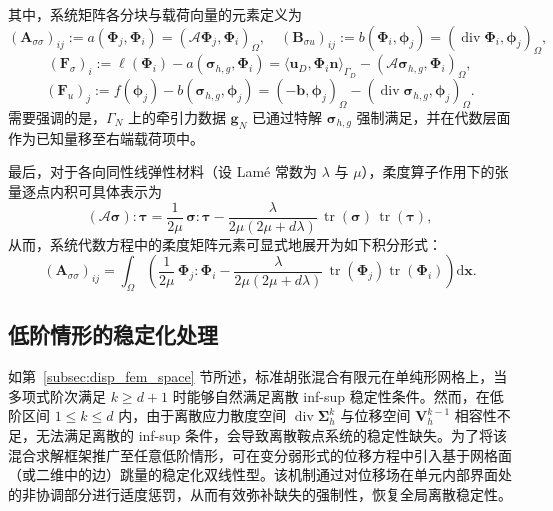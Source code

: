 其中，系统矩阵各分块与载荷向量的元素定义为
\[
(\boldsymbol{A}_{\sigma\sigma})_{ij}:=a(\boldsymbol{\Phi}_j,\boldsymbol{\Phi}_i)=(\mathcal{A}\boldsymbol{\Phi}_j,\boldsymbol{\Phi}_i)_\Omega,\quad
(\boldsymbol{B}_{\sigma u})_{ij}:=b(\boldsymbol{\Phi}_i,\boldsymbol{\phi}_j)=(\operatorname{div}\boldsymbol{\Phi}_i,\boldsymbol{\phi}_j)_\Omega,
\]
\[
(\boldsymbol{F}_{\sigma})_{i}:=\ell(\boldsymbol{\Phi}_i) - a(\boldsymbol{\sigma}_{h,g}, \boldsymbol{\Phi}_i) = \langle \boldsymbol{u}_D,\boldsymbol{\Phi}_i\boldsymbol{n}\rangle_{\Gamma_D} - (\mathcal{A}\boldsymbol{\sigma}_{h,g}, \boldsymbol{\Phi}_i)_\Omega,
\]
\[
(\boldsymbol{F}_{u})_{j}:=f(\boldsymbol{\phi}_j) - b(\boldsymbol{\sigma}_{h,g}, \boldsymbol{\phi}_j) =(-\boldsymbol{b},\boldsymbol{\phi}_j)_\Omega - (\operatorname{div}\boldsymbol{\sigma}_{h,g}, \boldsymbol{\phi}_j)_\Omega.
\]
需要强调的是，$\Gamma_N$ 上的牵引力数据 $\boldsymbol{g}_N$ 已通过特解 $\boldsymbol{\sigma}_{h,g}$ 强制满足，并在代数层面作为已知量移至右端载荷项中。

最后，对于各向同性线弹性材料（设 Lamé 常数为 $\lambda$ 与 $\mu$），柔度算子作用下的张量逐点内积可具体表示为
\[
(\mathcal{A}\boldsymbol{\sigma}):\boldsymbol{\tau} = \frac{1}{2\mu}\,\boldsymbol{\sigma}:\boldsymbol{\tau} - \frac{\lambda}{2\mu(2\mu+d\lambda)}\,\operatorname{tr}(\boldsymbol{\sigma})\,\operatorname{tr}(\boldsymbol{\tau}),
\]
从而，系统代数方程中的柔度矩阵元素可显式地展开为如下积分形式：
\[
(\boldsymbol{A}_{\sigma\sigma})_{ij} = \int_{\Omega}\left( \frac{1}{2\mu}\,\boldsymbol{\Phi}_j:\boldsymbol{\Phi}_i - \frac{\lambda}{2\mu(2\mu+d\lambda)}\,\operatorname{tr}(\boldsymbol{\Phi}_j)\operatorname{tr}(\boldsymbol{\Phi}_i) \right)\mathrm{d}\boldsymbol{x}.
\]


\subsection{低阶情形的稳定化处理}
\label{subsec:hz_stabilization}

如第~\ref{subsec:disp_fem_space} 节所述，标准胡张混合有限元在单纯形网格上，当多项式阶次满足 $k\ge d+1$ 时能够自然满足离散 inf-sup 稳定性条件。然而，在低阶区间 $1\le k\le d$ 内，由于离散应力散度空间 $\operatorname{div}\boldsymbol{\Sigma}_h^k$ 与位移空间 $\boldsymbol{V}_h^{k-1}$ 相容性不足，无法满足离散的 inf-sup 条件，会导致离散鞍点系统的稳定性缺失。为了将该混合求解框架推广至任意低阶情形，可在变分弱形式的位移方程中引入基于网格面（或二维中的边）跳量的稳定化双线性型。该机制通过对位移场在单元内部界面处的非协调部分进行适度惩罚，从而有效弥补缺失的强制性，恢复全局离散稳定性。

